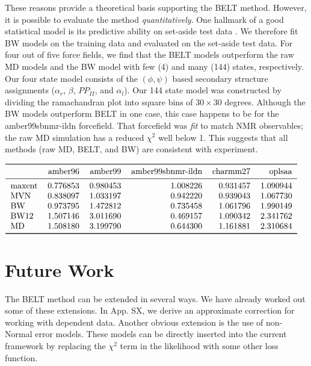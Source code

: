 \documentclass[journal=jacsat,manuscript=article]{achemso}
\begin{document}
These reasons provide a theoretical basis supporting the BELT method.  However, it is possible to evaluate the method \emph{quantitatively}.  One hallmark of a good statistical model is its predictive ability on set-aside test data \cite{friedman2001elements}.  We therefore fit BW models on the training data and evaluated on the set-aside test data.  For four out of five force fields, we find that the BELT models outperform the raw MD models and the BW model with few (4) and many (144) states, respectively.  Our four state model consists of the $(\phi, \psi)$ based secondary structure assignments \cite{Jha2005} ($\alpha_r$, $\beta$, $PP_{II}$, and $\alpha_l$).  Our 144 state model was constructed by dividing the ramachandran plot into square bins of $30\times30$ degrees.  Although the BW models outperform BELT in one case, this case happens to be for the amber99sbnmr-ildn forcefield.  That forcefield was \emph{fit} to match NMR observables; the raw MD simulation has a reduced $\chi^2$ well below 1.  This 
suggests that all methods (raw MD, BELT, and BW) are consistent with experiment.  

\begin{math}
\begin{tabular}{lrrrrr}
\toprule
{} &   amber96 &   amber99 &  amber99sbnmr-ildn &  charmm27 &    oplsaa \\
\midrule
maxent &  0.776853 &  0.980453 &           1.008226 &  0.931457 &  1.090944 \\
MVN    &  0.838097 &  1.033197 &           0.942220 &  0.939043 &  1.067730 \\
BW     &  0.973795 &  1.472812 &           0.735458 &  1.061796 &  1.990149 \\
BW12   &  1.507146 &  3.011690 &           0.469157 &  1.090342 &  2.341762 \\
MD     &  1.508180 &  3.199790 &           0.644300 &  1.161881 &  2.310684 \\
\bottomrule
\end{tabular}
\end{math}

\section{Future Work}

The BELT method can be extended in several ways.  We have already worked out some of these extensions.  In App. SX, we derive an approximate correction for working with dependent data.  Another obvious extension is the use of non-Normal error models.  These models can be directly inserted into the current framework by replacing the $\chi^2$ term in the likelihood with some other loss function.  
\end{document}
